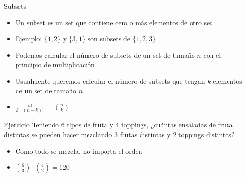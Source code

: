 \documentclass[10pt]{beamer}
\newcommand{\bi}{\begin{itemize}}
\newcommand{\ei}{\end{itemize}}
\begin{document}
\begin{frame}{Subsets}
  \bi
    \item Un subset es un set que contiene cero o más elementos de otro set
    \item Ejemplo: $\{1, 2\}$ y $\{3, 1\}$ son subsets de $\{1, 2, 3\}$
    \item<2-> Podemos calcular el número de subsets de un set de tamaño $n$ con el principio de multiplicación
    \item<2-> Usualmente queremos calcular el número de subsets que tengan $k$ elementos de un set de tamaño $n$
    \item<3-> \huge{$\frac{n!}{k! \cdot (n-k)!}$ = $\binom{n}{k}$}
  \ei
\end{frame}

\begin{frame}{Ejercicio}
  Teniendo 6 tipos de fruta y 4 toppings, ¿cuántas ensaladas de fruta distintas se pueden hacer 
  mezclando 3 frutas distintas y 2 toppings distintos?

  \bi
    \item<2-> Como todo se mezcla, no importa el orden
    \item<3-> $\binom{6}{3} \cdot \binom{4}{2} = 120$
  \ei
\end{frame}
\end{document}
